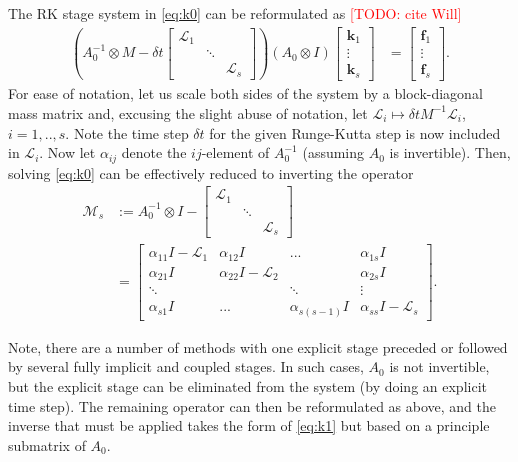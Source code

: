 \documentclass[review]{siamart}
\makeatletter
\newcommand{\todo}[1]{\textcolor{red}{[TODO\@: #1]}}
\makeatother
\begin{document}
The RK stage system in \eqref{eq:k0} can be reformulated as \todo{cite Will}
%
\begin{align}\label{eq:keq}
\left( A_0^{-1}\otimes M - \delta t \begin{bmatrix} \mathcal{L}_1  & \\ & \ddots \\ && \mathcal{L}_s\end{bmatrix}\right)
	(A_0\otimes I)	\begin{bmatrix} \mathbf{k}_1 \\ \vdots \\ \mathbf{k}_s \end{bmatrix} 
& = \begin{bmatrix} \mathbf{f}_1 \\ \vdots \\ \mathbf{f}_s \end{bmatrix}.
\end{align}
%
For ease of notation, let us scale both sides of the system by a block-diagonal mass matrix 
and, excusing the slight abuse of notation, let $\mathcal{L}_i \mapsto \delta t M^{-1}\mathcal{L}_i$,
$i=1,..,s$. Note the time step $\delta t$ for the given Runge-Kutta step is now included in $\mathcal{L}_i$. Now let $\alpha_{ij}$ denote the $ij$-element of $A_0^{-1}$ (assuming $A_0$ is
invertible). Then, solving \eqref{eq:k0} can be effectively reduced to inverting the operator
%
\begin{align}\nonumber
\mathcal{M}_s & := A_0^{-1}\otimes I - \begin{bmatrix} \mathcal{L}_1  & \\ & \ddots \\ && \mathcal{L}_s\end{bmatrix} \\
& = \begin{bmatrix} \alpha_{11}I - \mathcal{L}_1 & \alpha_{12}I & ... & \alpha_{1s}I \\
	\alpha_{21}I & \alpha_{22}I - \mathcal{L}_2 & & \alpha_{2s}I \\
	\ddots & & \ddots & \vdots \\ \alpha_{s1}I & ... & \alpha_{s(s-1)}I & \alpha_{ss}I - \mathcal{L}_s \end{bmatrix}.
	\label{eq:k1}
\end{align}
%

Note, there are a number of methods with one explicit stage preceded or followed by several
fully implicit and coupled stages. In such cases, $A_0$ is
not invertible, but the explicit stage can be eliminated from the system (by doing an explicit
time step). The remaining operator can then be reformulated as above, and the inverse that
must be applied takes the form of \eqref{eq:k1} but based on a principle submatrix of $A_0$.
\end{document}
